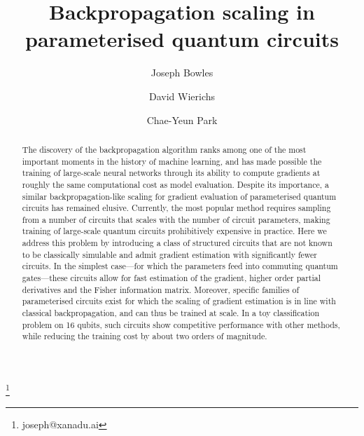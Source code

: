 \documentclass[a4paper,twocolumn,11pt]{quantumarticle}
\begin{document}
\title{Backpropagation scaling in parameterised quantum circuits}


\author{Joseph Bowles}\thanks{joseph@xanadu.ai}
\author{David Wierichs}
\author{Chae-Yeun Park}





\begin{abstract}
    The discovery of the backpropagation algorithm ranks among one of the most important moments in the history of machine learning, and has made possible the training of large-scale neural networks through its ability to compute gradients at roughly the same computational cost as model evaluation. Despite its importance, a similar backpropagation-like scaling for gradient evaluation of parameterised quantum circuits has remained elusive. Currently, the most popular method requires sampling from a number of circuits that scales with the number of circuit parameters,
    making training of large-scale quantum circuits prohibitively expensive in practice. Here we address this problem by introducing a class of structured circuits that are not known to be classically simulable and admit gradient estimation with significantly fewer circuits. 
    In the simplest case---for which the parameters feed into commuting quantum gates---these circuits allow for fast estimation of the gradient, higher order partial derivatives and the Fisher information matrix. Moreover, specific families of parameterised circuits exist for which the scaling of gradient estimation is in line with classical backpropagation, and can thus be trained at scale.
    In a toy classification problem on 16 qubits, such circuits show competitive performance with other methods, while reducing the training cost by about two orders of magnitude.



\end{abstract}
\end{document}
